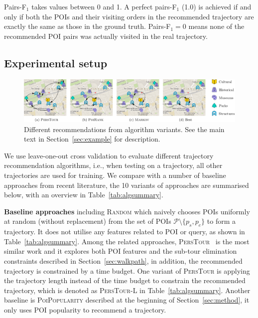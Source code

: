 Pairs-F$_1$ takes values between 0 and 1. A perfect pairs-F$_1$ (1.0) is achieved if and only if
both the POIs and their visiting orders in the
recommended trajectory are exactly the same as those in the ground truth.
Pairs-F$_1 = 0$ means none of the recommended POI pairs was actually visited in the real trajectory.


\subsection{Experimental setup}
\label{sec:setup}
\secmoveup
%

%

%
\begin{figure}[t]
	\centering
	\includegraphics[width=\textwidth]{fig/example-tour.pdf}
	\caption{Different recommendations from algorithm variants.
    See the main text in Section~\ref{sec:example} for description.}
	\label{fig:exampleresult}
	\captionmoveup
\end{figure}

We use leave-one-out cross validation to evaluate different trajectory recommendation algorithms,
i.e., when testing on a trajectory, all other trajectories are used for training.
We compare with a number of baseline approaches from recent literature, the 10 variants of approaches
are summarised below, with an overview in Table~\ref{tab:algsummary}.

{\bf Baseline approaches} including \textsc{Random} which naively chooses POIs uniformly at random
(without replacement) from the set of POIs $\mathcal{P} \setminus \{p_s, p_e \}$ to form a trajectory.
It does not utilise any features related to POI or query, as shown in Table~\ref{tab:algsummary}.
Among the related approaches, \textsc{PersTour}~\cite{ijcai15} is the most similar work and it
explores both POI features and the sub-tour elimination constraints described in Section~\ref{sec:walkpath},
in addition, the recommended trajectory is constrained by a time budget.
One variant of \textsc{PersTour} is applying the trajectory length instead of the time budget to constrain
the recommended trajectory, which is denoted as \textsc{PersTour-L} in Table~\ref{tab:algsummary}.
Another baseline is \textsc{PoiPopularity} described at the beginning of Section~\ref{sec:method},
it only uses POI popularity to recommend a trajectory.

